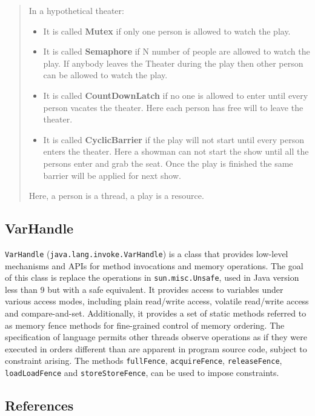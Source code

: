 \documentclass{latex/classes/thesis}
\begin{document}
\begin{quote}
In a hypothetical theater:

\begin{itemize}
\item It is called \textbf{Mutex} if only one person is allowed to watch the play.
\item It is called \textbf{Semaphore} if N number of people are allowed to watch the
play. If anybody leaves the Theater during the play then other person can
be allowed to watch the play.
\item It is called \textbf{CountDownLatch} if no one is allowed to enter until every
person vacates the theater. Here each person has free will to leave the
theater.
\item It is called \textbf{CyclicBarrier} if the play will not start until every person
enters the theater. Here a showman can not start the show until all the
persons enter and grab the seat. Once the play is finished the same barrier
will be applied for next show.
\end{itemize}

Here, a person is a thread, a play is a resource.
\end{quote}

\subsection{VarHandle}
\label{sec:org9832ad1}

\texttt{VarHandle} (\texttt{java.lang.invoke.VarHandle}) is a class that provides low-level
mechanisms and APIs for method invocations and memory operations. The goal of
this class is replace the operations in \texttt{sun.misc.Unsafe}, used in Java version
less than 9 but with a safe equivalent. It provides access to variables under
various access modes, including plain read/write access, volatile read/write
access and compare-and-set. Additionally, it provides a set of static methods
referred to as memory fence methods for fine-grained control of memory
ordering. The specification of language permits other threads observe
operations as if they were executed in orders different than are apparent in
program source code, subject to constraint arising. The methods \texttt{fullFence},
\texttt{acquireFence}, \texttt{releaseFence}, \texttt{loadLoadFence} and \texttt{storeStoreFence}, can be used to
impose constraints.


\subsection{References}
\label{sec:orga0fba88}
\end{document}
